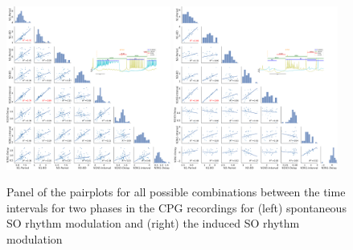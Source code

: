  
\begin{figure}[htbp]
	\centering
	\includegraphics[width=0.48\textwidth]{./img/invariants/data/SUSSEX/prep4_so_driven_2/images/panel_with_pairplot.pdf}
	\includegraphics[width=0.48\textwidth]{./img/invariants/data/SUSSEX/SO_driven/images/panel_with_pairplot.pdf}
	\caption{Panel of the pairplots for all possible combinations between the time intervals for two phases in the CPG recordings for (left) spontaneous SO rhythm modulation and (right) the induced SO rhythm modulation}
	\label{fig:so pairplot comparison}
\end{figure}

\newpage
